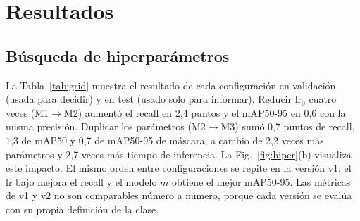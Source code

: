 \documentclass[conference]{IEEEtran}
\begin{document}
\section{Resultados}

\subsection{Búsqueda de hiperparámetros}
La Tabla~\ref{tab:grid} muestra el resultado de cada configuración en validación (usada para decidir) y en test (usado solo para informar). Reducir $\mathrm{lr}_0$ cuatro veces (M1$\to$M2) aumentó el recall en 2,4 puntos y el mAP50-95 en 0,6 con la misma precisión. Duplicar los parámetros (M2$\to$M3) sumó 0,7 puntos de recall, 1,3 de mAP50 y 0,7 de mAP50-95 de máscara, a cambio de 2,2 veces más parámetros y 2,7 veces más tiempo de inferencia. La Fig.~\ref{fig:hiper}(b) visualiza este impacto. El mismo orden entre configuraciones se repite en la versión v1: el lr bajo mejora el recall y el modelo $m$ obtiene el mejor mAP50-95. Las métricas de v1 y v2 no son comparables número a número, porque cada versión se evalúa con su propia definición de la clase.
\end{document}
